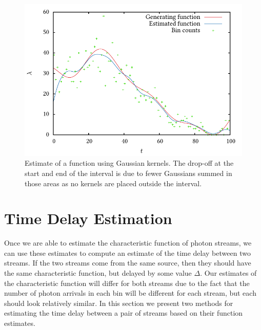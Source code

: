 \documentclass[a4paper,11pt,twoside]{article}
\begin{document}
   \begin{figure}[h]
   \includegraphics{images/gauss}
   \caption{Estimate of a function using Gaussian kernels. The drop-off at the
   start and end of the interval is due to fewer Gaussians summed in those areas
   as no kernels are placed outside the interval.}
   \label{fig:kde}
   \end{figure}
\section{Time Delay Estimation}
\label{sec-5}

  Once we are able to estimate the characteristic function of photon streams, we
  can use these estimates to compute an estimate of the time delay between two
  streams. If the two streams come from the same source, then they should have
  the same characteristic function, but delayed by some value $\Delta$. Our
  estimates of the characteristic function will differ for both streams due to
  the fact that the number of photon arrivals in each bin will be different for
  each stream, but each should look relatively similar. In this section we
  present two methods for estimating the time delay between a pair of streams
  based on their function estimates.
\end{document}
